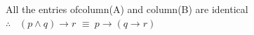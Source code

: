 \documentclass[17pt]{extarticle}
\begin{document}
\begin{fleqn}
\begin{tabular}{|c|*{7}{c|}}
\end{tabular} \\ \\
All the entries ofcolumn(A) and column(B) are identical \\
$\therefore$ \ $(p \wedge q) \to r$ $ \equiv \ p \to (q \to r)$ 


\begin{equation} \nonumber
\end{equation}





\end{fleqn}
\end{document}
